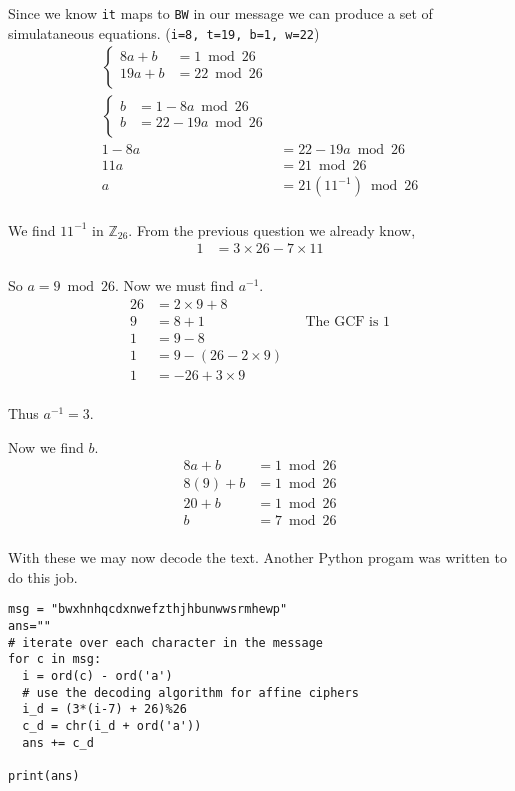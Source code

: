 \documentclass{article}
\begin{document}
Since we know \texttt{it} maps to \texttt{BW} in our message we can produce
a set of simulataneous equations. (\texttt{i=8, t=19, b=1, w=22})
\begin{align*}
    \begin{cases}
        8a + b &= 1 \bmod 26 \\
        19a + b &= 22 \bmod 26 \\
    \end{cases} \\
    \begin{cases}
        b &= 1 - 8a \bmod 26 \\
        b &= 22 - 19a \bmod 26 \\
    \end{cases} \\
    1 - 8a &= 22 - 19a \bmod 26 \\
    11a &= 21 \bmod 26 \\
    a &= 21(11^{-1}) \bmod 26 \\
\end{align*}

We find $11^{-1}$ in $\mathbb{Z}_{26}$. From the previous question we already
know,
\begin{align*}
    1 &= 3\times26 - 7\times11 \\
\end{align*}

So $a = 9 \bmod 26$. Now we must find $a^{-1}$.
\begin{align*}
    26 &= 2\times9 + 8 \\
    9 &= 8 + 1 && \text{The GCF is 1} \\
    1 &= 9 - 8 \\
    1 &= 9 - (26 - 2\times9) \\
    1 &= -26 + 3\times9 \\
\end{align*}

Thus $a^{-1} = 3$.

Now we find $b$.
\begin{align*}
    8a + b &= 1 \bmod 26 \\
    8(9) + b &= 1 \bmod 26 \\
    20 + b &= 1 \bmod 26 \\
    b &= 7 \bmod 26 \\
\end{align*}

With these we may now decode the text. Another Python progam was written to do
this job.
\begin{verbatim}
msg = "bwxhnhqcdxnwefzthjhbunwwsrmhewp"
ans=""
# iterate over each character in the message
for c in msg:
  i = ord(c) - ord('a')
  # use the decoding algorithm for affine ciphers
  i_d = (3*(i-7) + 26)%26
  c_d = chr(i_d + ord('a'))
  ans += c_d

print(ans)
\end{verbatim}
\end{document}
